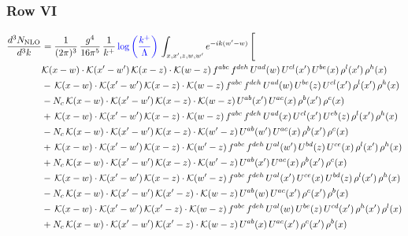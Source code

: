 \documentclass[9pt]{article}
\numberwithin{equation}{section}
\begin{document}
\subsubsection{Row VI}
\begin{align}
\frac{d^{3}N_{\mathrm{NLO}}}{d^{3}k} & = \frac{1}{(2\pi)^{3}}\,\frac{g^{4}}{16\pi^{5}}\,\frac{1}{k^{+}}\,{\color{blue}\log{\left(\frac{k^{+}}{\Lambda}\right)}}\,\int_{x,x',z,w,w'}e^{-ik(w'-w)}\,\Bigg[\notag\\ & \mathcal{K}(x-w)\cdot\mathcal{K}(x'-w')\,\mathcal{K}(x-z)\cdot\mathcal{K}(w-z)\,f^{abc}\,f^{deh}\,U^{ad}(w)\,U^{cl}(x')\,U^{be}(x)\,\rho^{l}(x')\,\rho^{h}(x)\notag\\
& -\,\mathcal{K}(x-w)\cdot\mathcal{K}(x'-w')\,\mathcal{K}(x-z)\cdot\mathcal{K}(w-z)\,f^{abc}\,f^{deh}\,U^{ad}(w)\,U^{be}(z)\,U^{cl}(x')\,\rho^{l}(x')\,\rho^{h}(x)\notag\\
& -N_{c}\,\mathcal{K}(x-w)\cdot\mathcal{K}(x'-w')\,\mathcal{K}(x-z)\cdot\mathcal{K}(w-z)\,U^{ab}(x')\,U^{ac}(x)\,\rho^{b}(x')\,\rho^{c}(x)\notag\\
& +\,\mathcal{K}(x-w)\cdot\mathcal{K}(x'-w')\,\mathcal{K}(x-z)\cdot\mathcal{K}(w-z)\,f^{abc}\,f^{deh}\,U^{ad}(x)\,U^{cl}(x')\,U^{eb}(z)\,\rho^{l}(x')\,\rho^{h}(x)\notag\\
& -N_{c}\,\mathcal{K}(x-w)\cdot\mathcal{K}(x'-w')\,\mathcal{K}(x-z)\cdot\mathcal{K}(w'-z)\,U^{ab}(w')\,U^{ac}(x)\,\rho^{b}(x')\,\rho^{c}(x)\notag\\
& +\,\mathcal{K}(x-w)\cdot\mathcal{K}(x'-w')\,\mathcal{K}(x-z)\cdot\mathcal{K}(w'-z)\,f^{abc}\,f^{deh}\,U^{al}(w')\,U^{bd}(z)\,U^{ce}(x)\,\rho^{l}(x')\,\rho^{h}(x)\notag\\
& +N_{c}\,\mathcal{K}(x-w)\cdot\mathcal{K}(x'-w')\,\mathcal{K}(x-z)\cdot\mathcal{K}(w'-z)\,U^{ab}(x')\,U^{ac}(x)\,\rho^{b}(x')\,\rho^{c}(x)\notag\\
& -\,\mathcal{K}(x-w)\cdot\mathcal{K}(x'-w')\,\mathcal{K}(x-z)\cdot\mathcal{K}(w'-z)\,f^{abc}\,f^{deh}\,U^{al}(x')\,U^{ce}(x)\,U^{bd}(z)\,\rho^{l}(x')\,\rho^{h}(x)\notag\\
& -N_{c}\,\mathcal{K}(x-w)\cdot\mathcal{K}(x'-w')\,\mathcal{K}(x'-z)\cdot\mathcal{K}(w-z)\,U^{ab}(w)\,U^{ac}(x')\,\rho^{c}(x')\,\rho^{b}(x)\notag\\
& -\,\mathcal{K}(x-w)\cdot\mathcal{K}(x'-w')\,\mathcal{K}(x'-z)\cdot\mathcal{K}(w-z)\,f^{abc}\,f^{deh}\,U^{al}(w)\,U^{be}(z)\,U^{cd}(x')\,\rho^{h}(x')\,\rho^{l}(x)\notag\\
& +N_{c}\,\mathcal{K}(x-w)\cdot\mathcal{K}(x'-w')\,\mathcal{K}(x'-z)\cdot\mathcal{K}(w-z)\,U^{ab}(x)\,U^{ac}(x')\,\rho^{c}(x')\,\rho^{b}(x)\notag\\

\end{align}
\end{document}
